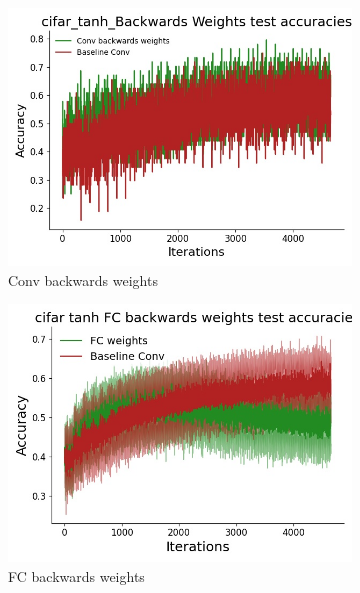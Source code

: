  \begin{figure}[htb]
    \centering %
\begin{subfigure}{0.3\textwidth}
  \includegraphics[width=\linewidth]{chapter_6_figures/AR/cifar_tanh_Backwards_Weights_test_accuracies_prelim_1.jpg}
  \caption{Conv backwards weights}
\end{subfigure}\hfil %
\begin{subfigure}{0.3\textwidth}
  \includegraphics[width=\linewidth]{chapter_6_figures/AR/cifar_tanh_FC_backwards_weights_test_accuracies_prelim_1.jpg}
  \caption{FC backwards weights}
\end{subfigure}\hfil %
\begin{subfigure}{0.3\textwidth}

\end{subfigure}
\end{figure}
